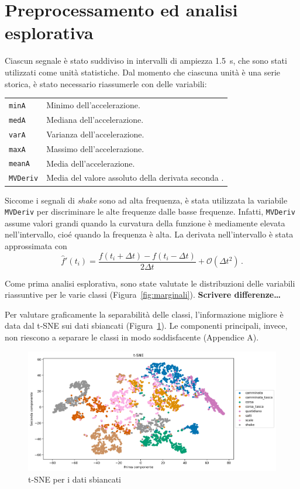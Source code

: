 \documentclass[./main.tex]{subfiles}
\begin{document}
\section{Preprocessamento ed analisi esplorativa}
Ciascun segnale è stato suddiviso in intervalli di ampiezza \SI{1.5}{s}, che sono stati utilizzati come unità statistiche. Dal momento che ciascuna unità è una serie storica, è stato necessario riassumerle con delle variabili:
\begin{table}[H]
	\centering
	\begin{tabular}{ll}
		\texttt{minA}& Minimo dell'accelerazione.\\
		\texttt{medA}& Mediana dell'accelerazione.\\
		\texttt{varA}& Varianza dell'accelerazione.\\
		\texttt{maxA}& Massimo dell'accelerazione.\\
		\texttt{meanA}& Media dell'accelerazione.\\
		\texttt{MVDeriv}& Media del valore assoluto della derivata seconda .
	\end{tabular}
\end{table}
Siccome i segnali di {\em shake} sono ad alta frequenza, è stata utilizzata la variabile \texttt{MVDeriv} per discriminare le alte frequenze dalle basse frequenze. Infatti, \texttt{MVDeriv} assume valori grandi quando la curvatura della funzione è mediamente elevata nell'intervallo, cioé quando la frequenza è alta. La derivata nell'intervallo è stata approssimata con\cite{NumpyGradientNumPy}
\[
\hat{f}'(t_i) = \dfrac{f(t_i + \Delta t) - f(t_i - \Delta t)}{2\Delta t} + \mathcal{O}(\Delta t^2)\,.
\]

Come prima analisi esplorativa, sono state valutate le distribuzioni delle variabili riassuntive per le varie classi (Figura~\ref{fig:marginali}). \textbf{Scrivere differenze\dots}

Per valutare graficamente la separabilità delle classi, l'informazione migliore è data dal t-SNE sui dati sbiancati (Figura~\ref{fig:tsne}). Le componenti principali, invece, non riescono a separare le classi in modo soddisfacente (Appendice A).
\begin{figure}[H]
	\centering
	\includegraphics[width=.8\textwidth]{../../figure/t-SNE.png}
	\caption{{ t-SNE per i dati sbiancati}}
	\label{fig:tsne}
\end{figure}
\end{document}
